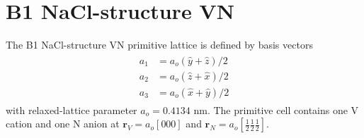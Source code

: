 \documentclass[twocolumn,showpacs,preprintnumbers,superscriptaddress,prb,floatfix,aps,10pt]{revtex4-1}
\renewcommand{\vec}[1]{\ensuremath{\mathbf{#1}}}
\begin{document}
%




\section{\label{appendix:groups} B1 NaCl-structure VN}

The B1 NaCl-structure VN primitive lattice is defined by basis vectors 
%
\begin{align}
\begin{split}
a_1 &= a_o (\hat{y} + \hat{z})/2 \\
a_2 &= a_o (\hat{z} + \hat{x})/2 \\ 
a_3 &= a_o (\hat{x} + \hat{y})/2	
\end{split}
\end{align}
%
with relaxed-lattice parameter $a_o = 0.4134$ nm. The primitive cell contains one V cation and one N anion at $\vec{r}_V = a_o[000]$ and $\vec{r}_N = a_o[\frac{1}{2}\frac{1}{2}\frac{1}{2}]$.  
\end{document}
